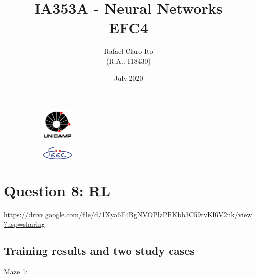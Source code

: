 \documentclass[a4paper]{article}    %
\begin{document}
\begin{figure}
    \centering
    \begin{subfigure}{0.45\textwidth}
        \centering
        \includegraphics[width=1.5cm]{unicamp}
    \end{subfigure}
    \hfill
    \begin{subfigure}{0.45\textwidth}
        \centering
        \includegraphics[width=1.5cm]{feec}
    \end{subfigure}
\end{figure}

\title{
    \vspace{5cm}
    IA353A - Neural Networks\\
    EFC4
    \vspace{1cm}
}
\author{
    Rafael Claro Ito\\
    (R.A.: 118430)
    \vspace{11cm}
}
\date{July 2020}
\maketitle
\newpage

\section*{Question 8: RL}
\addtocounter{section}{8}

\href{https://drive.google.com/file/d/1Xya6E4BgNVOPlzPRKbb3C59rvKI6V2nk/view?usp=sharing}{https://drive.google.com/file/d/1Xya6E4BgNVOPlzPRKbb3C59rvKI6V2nk/view?usp=sharing}

\subsection{Training results and two study cases}

Maze 1:
\end{document}
